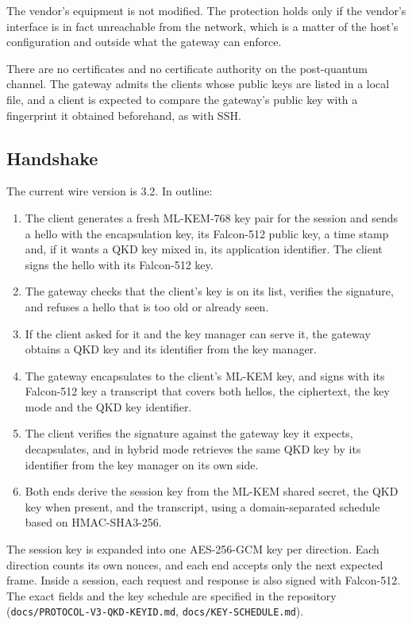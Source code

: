 \documentclass[11pt,letterpaper]{article}
\begin{document}
The vendor's equipment is not modified. The protection holds only if the vendor's interface is in fact unreachable from the network, which is a matter of the host's configuration and outside what the gateway can enforce.

There are no certificates and no certificate authority on the post-quantum channel. The gateway admits the clients whose public keys are listed in a local file, and a client is expected to compare the gateway's public key with a fingerprint it obtained beforehand, as with SSH.

\subsection{Handshake}

The current wire version is 3.2. In outline:

\begin{enumerate}
    \item The client generates a fresh ML-KEM-768 key pair for the session and sends a hello with the encapsulation key, its Falcon-512 public key, a time stamp and, if it wants a QKD key mixed in, its application identifier. The client signs the hello with its Falcon-512 key.
    \item The gateway checks that the client's key is on its list, verifies the signature, and refuses a hello that is too old or already seen.
    \item If the client asked for it and the key manager can serve it, the gateway obtains a QKD key and its identifier from the key manager.
    \item The gateway encapsulates to the client's ML-KEM key, and signs with its Falcon-512 key a transcript that covers both hellos, the ciphertext, the key mode and the QKD key identifier.
    \item The client verifies the signature against the gateway key it expects, decapsulates, and in hybrid mode retrieves the same QKD key by its identifier from the key manager on its own side.
    \item Both ends derive the session key from the ML-KEM shared secret, the QKD key when present, and the transcript, using a domain-separated schedule based on HMAC-SHA3-256.
\end{enumerate}

The session key is expanded into one AES-256-GCM key per direction. Each direction counts its own nonces, and each end accepts only the next expected frame. Inside a session, each request and response is also signed with Falcon-512. The exact fields and the key schedule are specified in the repository (\texttt{docs/PROTOCOL-V3-QKD-KEYID.md}, \texttt{docs/KEY-SCHEDULE.md}).
\end{document}
